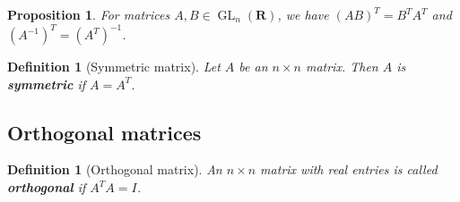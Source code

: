 \documentclass[12pt]{article}
\numberwithin{equation}{subsection}
\newtheorem{prop}[subsection]{Proposition}
\newtheorem{defn}[subsection]{Definition}
\theoremstyle{note}
\newcommand{\GL}{\operatorname{GL}}
\begin{document}
\begin{prop} \label{transposition-ex}
	For matrices $A,B\in \GL_n(\mathbf{R})$, we have $(AB)^T=B^TA^T$ and $(A^{-1})^T=(A^T)^{-1}$.
\end{prop}


\begin{defn}[Symmetric matrix]
Let $A$ be an $n\times n$ matrix. Then $A$ is \textbf{symmetric} if $A=A^T$. 
\end{defn}
\subsection{Orthogonal matrices}

\begin{defn}[Orthogonal matrix] An $n\times n$ matrix with real entries is called \textbf{orthogonal} if $A^TA=I$. 
\end{defn}
\end{document}
